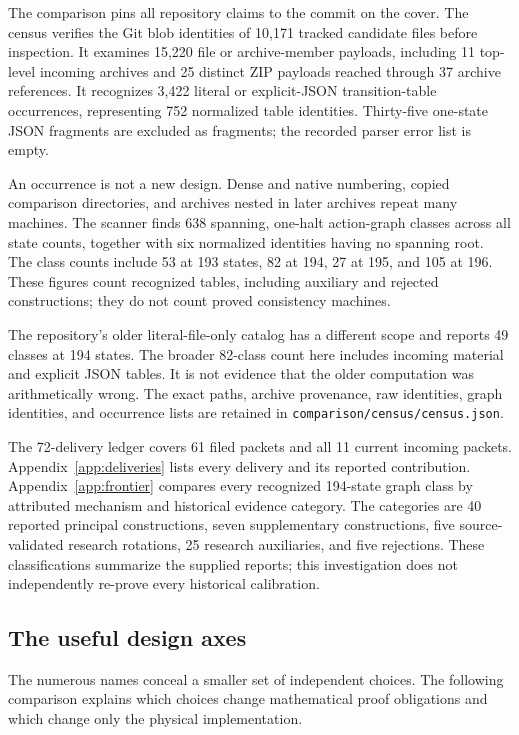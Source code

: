 \documentclass[11pt,a4paper]{article}
\newcommand{\file}[1]{\texttt{\nolinkurl{#1}}}
\begin{document}
The comparison pins all repository claims to the commit on the cover.
The census verifies the Git blob identities of 10,171 tracked candidate
files before inspection. It examines 15,220 file or archive-member
payloads, including 11 top-level incoming archives and 25 distinct ZIP
payloads reached through 37 archive references. It recognizes 3,422
literal or explicit-JSON transition-table occurrences, representing
752 normalized table identities. Thirty-five one-state JSON fragments
are excluded as fragments; the recorded parser error list is empty.

An occurrence is not a new design. Dense and native numbering, copied
comparison directories, and archives nested in later archives repeat
many machines. The scanner finds 638 spanning, one-halt action-graph
classes across all state counts, together with six normalized identities
having no spanning root. The class counts include 53 at 193 states,
82 at 194, 27 at 195, and 105 at 196. These figures count recognized
tables, including auxiliary and rejected constructions; they do not
count proved consistency machines.

The repository's older literal-file-only catalog has a different scope
and reports 49 classes at 194 states. The broader 82-class count here
includes incoming material and explicit JSON tables. It is not evidence
that the older computation was arithmetically wrong. The exact paths,
archive provenance, raw identities, graph identities, and occurrence
lists are retained in \file{comparison/census/census.json}.

The 72-delivery ledger covers 61 filed packets and all 11 current
incoming packets. Appendix~\ref{app:deliveries} lists every delivery
and its reported contribution. Appendix~\ref{app:frontier} compares
every recognized 194-state graph class by attributed mechanism and
historical evidence category. The categories are 40 reported principal
constructions, seven supplementary constructions, five source-validated
research rotations, 25 research auxiliaries, and five rejections.
These classifications summarize the supplied reports; this investigation
does not independently re-prove every historical calibration.

\subsection{The useful design axes}

The numerous names conceal a smaller set of independent choices.
The following comparison explains which choices change mathematical
proof obligations and which change only the physical implementation.
\end{document}
